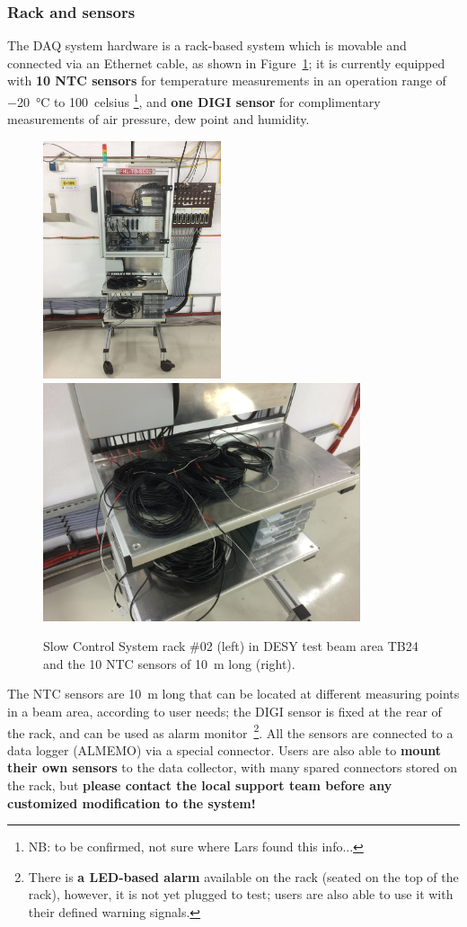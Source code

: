 \documentclass[a4paper,12pt]{scrartcl}
\begin{document}
\subsubsection*{Rack and sensors}
The DAQ system hardware is a rack-based system which is movable and connected via an Ethernet cable, as shown in Figure~\ref{fig:sc-rack}; it is currently equipped with \textbf{10 NTC sensors} for temperature measurements in an operation range of \SI{-20}{\celsius} to \SI{+100}{celsius} \footnote{NB: to be confirmed, not sure where Lars found this info...}, and \textbf{one DIGI sensor} for complimentary measurements of air pressure, dew point and humidity.
\begin{figure}[!ht]
  \centering
  \includegraphics[height=7cm]{figs/Rackganz.jpg}%
  \includegraphics[height=7cm]{figs/Sensoren.jpg}
\caption{Slow Control System rack \#02 (left) in DESY test beam area TB24 and the 10 NTC sensors of \SI{10}{m} long (right).}
\label{fig:sc-rack}
\end{figure}

The NTC sensors are \SI{10}{m} long that can be located at different measuring points in a beam area, according to user needs; the DIGI sensor is fixed at the rear of the rack, and can be used as alarm monitor~\footnote{There is \textbf{a LED-based alarm} available on the rack (seated on the top of the rack), however, it is not yet plugged to test; users are also able to use it with their defined warning signals.}. All the sensors are connected to a data logger (ALMEMO) via a special connector. Users are also able to \textbf{mount their own sensors} to the data collector, with many spared connectors stored on the rack, but \textbf{please contact the local support team before any customized modification to the system!}
\end{document}
